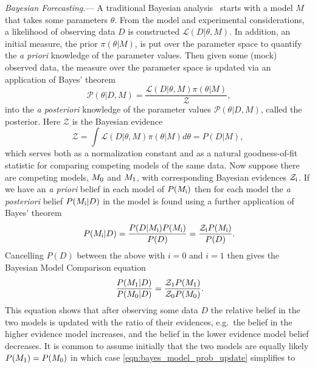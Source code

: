 \documentclass[twocolumn,english,aps,prd,amsmath,amssymb,reprint,floatfix,nofootinbib,showkeys]{revtex4-2}
\newcommand{\modelz}{M_{\rm 0}}
\newcommand{\modelo}{M_{\rm 1}}
\newcommand{\post}{\mathcal{P}}
\newcommand{\prior}{\pi}
\newcommand{\like}{\mathcal{L}}
\newcommand{\Z}{\mathcal{Z}}
\begin{document}
\textit{Bayesian Forecasting.}---
A traditional Bayesian analysis~\citep[see][for a more detailed discussion]{Mackay_2003} starts with a model $M$ that takes some parameters $\theta$.
From the model and experimental considerations, a likelihood of observing data $D$ is constructed $\like(D | \theta, M)$.
In addition, an initial measure, the prior $\prior(\theta | M)$, is put over the parameter space to quantify the \textit{a priori} knowledge of the parameter values.
Then given some (mock) observed data, the measure over the parameter space is updated via an application of Bayes' theorem
\begin{equation}~\label{eqn:bayes}
    \post(\theta | D, M) = \frac{\like(D | \theta, M) \prior(\theta | M)}{\Z},
\end{equation}
into the \textit{a posteriori} knowledge of the parameter values $\post(\theta | D, M)$, called the posterior. 
Here $\Z$ is the Bayesian evidence
\begin{equation}
    \Z = \int \like(D | \theta, M) \prior(\theta | M) d\theta = P(D | M),
\end{equation}
which serves both as a normalization constant and as a natural goodness-of-fit statistic for comparing competing models of the same data.
Now suppose there are competing models, $\modelz$ and $\modelo$, with corresponding Bayesian evidences $\Z_{\rm i}$.
If we have an \textit{a priori} belief in each model of $P(M_{\rm i})$ then for each model the \textit{a posteriori} belief  $P(M_{\rm i}| D)$ in the model is found using a further application of Bayes' theorem
\begin{equation}~\label{eqn:bayes_on_models}
    P(M_{\rm i}| D) = \frac{P(D | M_{\rm i}) P(M_{\rm i})}{P(D)} = \frac{\Z_{\rm i} P(M_{\rm i})}{P(D)}.
\end{equation}
Cancelling $P(D)$ between the above with $i = 0$ and $i = 1$ then gives the Bayesian Model Comparison equation
\begin{equation}~\label{eqn:bayes_model_prob_update}
    \frac{P(\modelo| D)}{P(\modelz | D)} = \frac{\Z_{\rm 1} P(\modelo)}{\Z_{\rm 0} P(\modelz)}.
\end{equation}
This equation shows that after observing some data $D$ the relative belief in the two models is updated with the ratio of their evidences, e.g.\ the belief in the higher evidence model increases, and the belief in the lower evidence model belief decreases. 
It is common to assume initially that the two models are equally likely $P(\modelo) = P(\modelz)$ in which case \cref{eqn:bayes_model_prob_update} simplifies to
\end{document}
